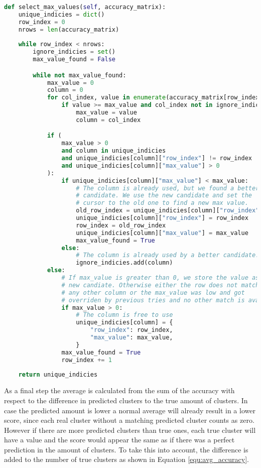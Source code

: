 \begin{lstlisting}[language=Python, caption=Select relevant accuracy values from a accuracy matrix., label={lst:select_max_values}]
def select_max_values(self, accuracy_matrix):
    unique_indicies = dict()
    row_index = 0
    nrows = len(accuracy_matrix)
    
    while row_index < nrows:
        ignore_indicies = set()
        max_value_found = False

        while not max_value_found:
            max_value = 0
            column = 0
            for col_index, value in enumerate(accuracy_matrix[row_index]):
                if value >= max_value and col_index not in ignore_indicies:
                    max_value = value
                    column = col_index

            if (
                max_value > 0
                and column in unique_indicies
                and unique_indicies[column]["row_index"] != row_index
                and unique_indicies[column]["max_value"] > 0
            ):
                if unique_indicies[column]["max_value"] < max_value:
                    # The column is already used, but we found a better 
                    # candidate. We use the new candidate and set the 
                    # cursor to the old one to find a new max value.
                    old_row_index = unique_indicies[column]["row_index"]
                    unique_indicies[column]["row_index"] = row_index
                    row_index = old_row_index
                    unique_indicies[column]["max_value"] = max_value
                    max_value_found = True
                else:
                    # The column is already used by a better candidate.
                    ignore_indicies.add(column)
            else:
                # If max_value is greater than 0, we store the value as a 
                # new candiate. Otherwise either the row does not match 
                # any other column or the max_value was low and got 
                # overriden by previous tries and no other match is available. 
                if max_value > 0:
                    # The column is free to use
                    unique_indicies[column] = {
                        "row_index": row_index,
                        "max_value": max_value,
                    }
                max_value_found = True
                row_index += 1
    
    return unique_indicies
\end{lstlisting}

As a final step the average is calculated from the sum of the accuracy with respect to the difference in predicted clusters to the true amount of clusters. In case the predicted amount is lower a normal average will already result in a lower score, since each real cluster without a matching predicted cluster counts as zero. However if there are more predicted clusters than true ones, each true cluster will have a value and the score would appear the same as if there was a perfect prediction in the amount of clusters. To take this into account, the difference is added to the number of true clusters as shown in Equation \ref{equ:avg_accuracy}.

